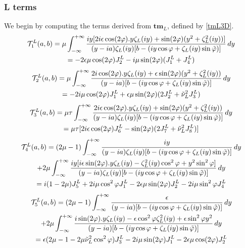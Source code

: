 \subsubsection{L terms}
We begin by computing the terms derived from $\mathbf{tm}_L$, defined by \eqref{tmL3D}.
\begin{multline}
\mathcal{T}_1^L(a,b)= \mu \int_{-\infty}^{+\infty} \frac{iy\lbrack 2i\epsilon\cos(2\varphi).y\zeta_L(iy)+\sin(2\varphi)(y^2+\zeta_L^2(iy))\rbrack}{(y-ia)\zeta_L(iy)\lbrack b- (iy\cos \varphi+ \zeta_L(iy)\sin\phiti) \rbrack} \, dy \\
\hfill =-2\epsilon\mu\cos(2\varphi)J_2^L-i\mu\sin(2\varphi)(J_1^L+J_4^L) \hfill
\end{multline}
\begin{multline}
\mathcal{T}_2^L(a,b)=\mu \int_{-\infty}^{+\infty} \frac{2i \cos(2\varphi).y\zeta_L(iy)+\epsilon \sin(2\varphi)(y^2+\zeta_L^2(iy))}{(y-ia)\lbrack b- (iy\cos \varphi+\zeta_L(iy)\sin\phiti )\rbrack} \, dy \\
\hfill =-2i\mu\cos(2\varphi)J_1^L+\epsilon\mu\sin(2\varphi)(2J_2^L+\nuti_L^2J_3^L) \hfill
\end{multline}
\begin{multline}
\mathcal{T}_3^L(a,b)=\mu\tau \int_{-\infty}^{+\infty} \frac{ 2i\epsilon\cos(2\varphi).y\zeta_L(iy)+\sin(2\varphi)(y^2+\zeta_L^2(iy))}{(y-ia)\zeta_L(iy)\lbrack b- (iy\cos \varphi+ \zeta_L(iy)\sin \phiti) \rbrack} \, dy \\
\hfill =\mu\tau \lbrack 2i\epsilon\cos(2\varphi)J_6^L-\sin(2\varphi)(2J_7^L+\nuti_L^2J_8^L) \rbrack \hfill
\end{multline}
\begin{multline}
\mathcal{T}_4^L(a,b)= (2\mu-1) \int_{-\infty}^{+\infty}\frac{iy}{(y-ia)\zeta_L(iy)\lbrack b-(iy\cos \varphi+\zeta_L(iy)\sin\phiti) \rbrack} \, dy \\
+2 \mu\int_{-\infty}^{+\infty} \frac{iy\lbrack i\epsilon\sin(2\varphi).y\zeta_L(iy)-\zeta_L^2(iy)\cos^2\varphi+y^2\sin^2\varphi \rbrack}{(y-ia)\zeta_L(iy)\lbrack b- (iy\cos \varphi+\zeta_L(iy)\sin\phiti) \rbrack} \, dy\\
\hfill=i(1-2\mu)J_5^L+2i\mu\cos^2\varphi J_1^L-2\epsilon\mu\sin(2\varphi)J_2^L-2i\mu\sin^2\varphi J_4^L \hfill
\end{multline}
\begin{multline}
\mathcal{T}_5^L(a,b)= (2\mu-1) \int_{-\infty}^{+\infty}\frac{\epsilon}{(y-ia)\lbrack b- (iy\cos \varphi+\zeta_L(iy)\sin\phiti) \rbrack} \, dy \\
+2\mu\int_{-\infty}^{+\infty} \frac{ i\sin(2\varphi).y\zeta_L(iy)-\epsilon \cos^2\varphi \zeta_L^2(iy)+\epsilon \sin^2\varphi y^2}{(y-ia)\lbrack b- (iy\cos \varphi+\zeta_L(iy)\sin\phiti) \rbrack} \, dy \\
\hfill=\epsilon(2\mu-1-2\mu\nuti_L^2\cos^2\varphi)J_3^L-2i\mu\sin(2\varphi)J_1^L-2\epsilon\mu\cos(2\varphi)J_2^L\hfill
\end{multline}
